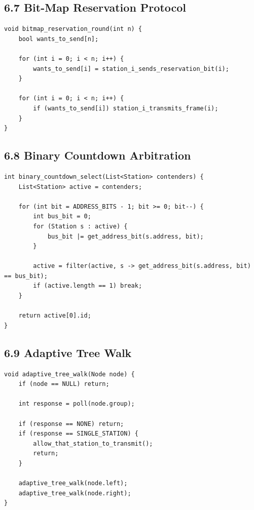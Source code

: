 \documentclass[11pt]{article}
\begin{document}
\subsection{6.7 Bit-Map Reservation
Protocol}\label{bit-map-reservation-protocol}

\begin{verbatim}
void bitmap_reservation_round(int n) {
    bool wants_to_send[n];

    for (int i = 0; i < n; i++) {
        wants_to_send[i] = station_i_sends_reservation_bit(i);
    }

    for (int i = 0; i < n; i++) {
        if (wants_to_send[i]) station_i_transmits_frame(i);
    }
}
\end{verbatim}

\subsection{6.8 Binary Countdown
Arbitration}\label{binary-countdown-arbitration}

\begin{verbatim}
int binary_countdown_select(List<Station> contenders) {
    List<Station> active = contenders;

    for (int bit = ADDRESS_BITS - 1; bit >= 0; bit--) {
        int bus_bit = 0;
        for (Station s : active) {
            bus_bit |= get_address_bit(s.address, bit);
        }

        active = filter(active, s -> get_address_bit(s.address, bit) == bus_bit);
        if (active.length == 1) break;
    }

    return active[0].id;
}
\end{verbatim}

\subsection{6.9 Adaptive Tree Walk}\label{adaptive-tree-walk}

\begin{verbatim}
void adaptive_tree_walk(Node node) {
    if (node == NULL) return;

    int response = poll(node.group);

    if (response == NONE) return;
    if (response == SINGLE_STATION) {
        allow_that_station_to_transmit();
        return;
    }

    adaptive_tree_walk(node.left);
    adaptive_tree_walk(node.right);
}
\end{verbatim}
\end{document}
